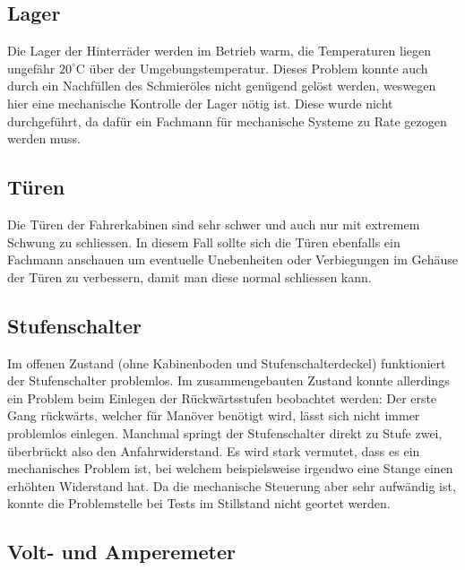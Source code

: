 \subsection{Lager}
Die Lager der Hinterräder werden im Betrieb warm, die Temperaturen liegen ungefähr $20^\circ$C über der Umgebungstemperatur. Dieses Problem konnte auch durch ein Nachfüllen des Schmieröles nicht genügend gelöst werden, weswegen hier eine mechanische Kontrolle der Lager nötig ist. Diese wurde nicht durchgeführt, da dafür ein Fachmann für mechanische Systeme zu Rate gezogen werden muss.

\subsection{Türen}
Die Türen der Fahrerkabinen sind sehr schwer und auch nur mit extremem Schwung zu schliessen. In diesem Fall sollte sich die Türen ebenfalls ein Fachmann anschauen um eventuelle Unebenheiten oder Verbiegungen im Gehäuse der Türen zu verbessern, damit man diese normal schliessen kann.

\subsection{Stufenschalter}
Im offenen Zustand (ohne Kabinenboden und Stufenschalterdeckel) funktioniert der Stufenschalter problemlos. Im zusammengebauten Zustand konnte allerdings ein Problem beim Einlegen der Rückwärtsstufen beobachtet werden: Der erste Gang rückwärts, welcher für Manöver benötigt wird, lässt sich nicht immer problemlos einlegen. Manchmal springt der Stufenschalter direkt zu Stufe zwei, überbrückt also den Anfahrwiderstand. Es wird stark vermutet, dass es ein mechanisches Problem ist, bei welchem beispielsweise irgendwo eine Stange einen erhöhten Widerstand hat. Da die mechanische Steuerung aber sehr aufwändig ist, konnte die Problemstelle bei Tests im Stillstand nicht geortet werden.

\subsection{Volt- und Amperemeter}

\color{black}